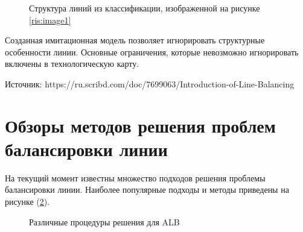 \begin{figure}[H]
    \caption{Структура линий из классификации, изображенной на рисунке \ref{ris:image1}}
    \label{ris:shapeOfLines}
\end{figure}

Созданная имитационная модель позволяет игнорировать структурные особенности линии. Основные ограничения, которые невозможно игнорировать включены в технологическую карту. 

Источник: https://ru.scribd.com/doc/7699063/Introduction-of-Line-Balancing



\section{Обзоры методов решения проблем балансировки линии}

На текущий момент известны множество подходов решения проблемы балансировки линии. Наиболее популярные подходы и методы приведены на рисунке (\ref{ris:Approaches}).

\begin{figure}[H]
    \caption{Различные процедуры решения для ALB}
    \label{ris:Approaches}
\end{figure}

